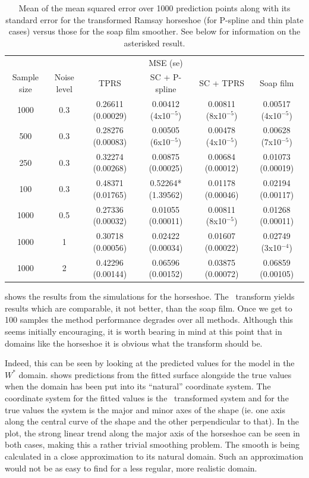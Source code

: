 \begin{table}[ht]
\begin{tabular}{c c c c c c}\\
& & & MSE (se) &\\
Sample size & Noise level & TPRS & SC + P-spline& SC + TPRS & Soap film\\
\hline
\hline
1000 & 0.3 & 0.26611 (0.00029) & 0.00412 (4x10$^{-5}$) & 0.00811 (8x10$^{-5}$) & 0.00517 (4x10$^{-5}$) \\ 
500 & 0.3 & 0.28276 (0.00083) & 0.00505 (6x10$^{-5}$) & 0.00478 (4x10$^{-5}$) & 0.00628 (7x10$^{-5}$) \\ 
250 & 0.3 & 0.32274 (0.00268) & 0.00875 (0.00025) & 0.00684 (0.00012) & 0.01073 (0.00019) \\ 
100 & 0.3 & 0.48371 (0.01765) & 0.52264* (1.39562) & 0.01178 (0.00046) & 0.02194 (0.00117) \\ 
1000 & 0.5 & 0.27336 (0.00032) & 0.01055 (0.00011) & 0.00811 (8x10$^{-5}$) & 0.01268 (0.00011) \\ 
1000 & 1 & 0.30718 (0.00056) & 0.02422 (0.00034) & 0.01607 (0.00022) & 0.02749 (3x10$^{-4}$) \\ 
1000 & 2 & 0.42296 (0.00144) & 0.06596 (0.00152) & 0.03875 (0.00072) & 0.06859 (0.00105) \\ 
\end{tabular}
\label{scramsayres}
\caption{Mean of the mean squared error over 1000 prediction points along with its standard error for the transformed Ramsay horseshoe (for P-spline and thin plate cases) versus those for the soap film smoother. See below for information on the asterisked result.}
\end{table}

 shows the results from the simulations for the horseshoe. The \sch\ transform yields results which are comparable, it not better, than the soap film. Once we get to 100 samples the method performance degrades over all methods. Although this seems initially encouraging, it is worth bearing in mind at this point that in domains like the horseshoe it is obvious what the transform should be.

Indeed, this can be seen by looking at the predicted values for the model in the $W^*$ domain.  shows predictions from the fitted surface alongside the true values when the domain has been put into its ``natural'' coordinate system. The coordinate system for the fitted values is the \sch\ transformed system and for the true values the system is the major and minor axes of the shape (ie. one axis along the central curve of the shape and the other perpendicular to that). In the plot, the strong linear trend along the major axis of the horseshoe can be seen in both cases, making this a rather trivial smoothing problem. The smooth is being calculated in a close approximation to its natural domain. Such an approximation would not be as easy to find for a less regular, more realistic domain.

